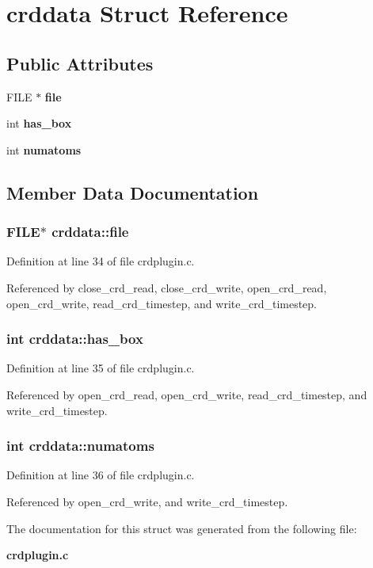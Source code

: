 \section{crddata  Struct Reference}
\label{structcrddata}
\subsection*{Public Attributes}
\begin{CompactItemize}
\item 
FILE $\ast$ {\bf file}
\item 
int {\bf has\_\-box}
\item 
int {\bf numatoms}
\end{CompactItemize}


\subsection{Member Data Documentation}
\subsubsection{\setlength{\rightskip}{0pt plus 5cm}FILE$\ast$ crddata::file}\label{structcrddata_m0}




Definition at line 34 of file crdplugin.c.

Referenced by close\_\-crd\_\-read, close\_\-crd\_\-write, open\_\-crd\_\-read, open\_\-crd\_\-write, read\_\-crd\_\-timestep, and write\_\-crd\_\-timestep.
\subsubsection{\setlength{\rightskip}{0pt plus 5cm}int crddata::has\_\-box}\label{structcrddata_m1}




Definition at line 35 of file crdplugin.c.

Referenced by open\_\-crd\_\-read, open\_\-crd\_\-write, read\_\-crd\_\-timestep, and write\_\-crd\_\-timestep.
\subsubsection{\setlength{\rightskip}{0pt plus 5cm}int crddata::numatoms}\label{structcrddata_m2}




Definition at line 36 of file crdplugin.c.

Referenced by open\_\-crd\_\-write, and write\_\-crd\_\-timestep.

The documentation for this struct was generated from the following file:\begin{CompactItemize}
\item 
{\bf crdplugin.c}\end{CompactItemize}
